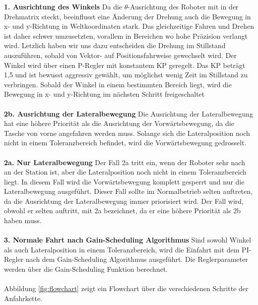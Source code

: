 \textbf{1. Ausrichtung des Winkels}
Da die $\theta$-Ausrichtung des Roboter mit in der Drehmatrix steckt, beeinflusst eine Änderung der Drehung auch die Bewegung in x- und y-Richtung in Weltkoordinaten stark. Das gleichzeitige Fahren und Drehen ist daher schwer umzusetzten, vorallem in Bereichen wo hohe Präzision verlangt wird. Letzlich haben wir uns dazu entscheiden die Drehung im Stillstand auszuführen, sobald von Vektor- auf Positionsfahrweise gewechselt wird. Der Winkel wird über einen P-Regler mit konstantem KP geregelt. Das KP beträgt 1,5 und ist bewusst aggressiv gewählt, um möglichst wenig Zeit im Stillstand zu verbringen. Sobald der Winkel in einem bestimmten Bereich liegt, wird die Bewegung in x- und y-Richtung im nächsten Schritt freigeschaltet\\
\\
\textbf{2b. Ausrichtung der Lateralbewegung}
Die Ausrichtung der Lateralbewegung hat eine höhere Priorität als die Ausrichtung der Vorwärtsbewegung, da die Tasche von vorne angefahren werden muss. Solange sich die Lateralposition noch nicht in einem Toleranzbereich befindet, wird die Vorwärtsbewegung gedrosselt. \\
\\
\textbf{2a. Nur Lateralbewegung}
Der Fall 2a tritt ein, wenn der Roboter sehr nach an der Station ist, aber die Lateralposition noch nicht in einem Toleranzbereich liegt. In diesem Fall wird die Vorwärtsbewegung komplett gesperrt und nur die Lateralbewegung ausgeführt. Dieser Fall sollte im Normalbetrieb selten auftreten, da die Ausrichtung der Lateralbewegung immer priorisiert wird. Der Fall wird, obwohl er selten auftritt, mit 2a bezeichnet, da er eine höhere Priorität als 2b haben muss.\\
\\
\textbf{3. Normale Fahrt nach Gain-Scheduling Algorithmus}
Sind sowohl Winkel als auch Lateralposition in einem Toleranzbereich, wird die Einfahrt mit dem PI-Regler nach dem Gain-Scheduling Algorithmus ausgeführt. Die Reglerparameter werden über die Gain-Scheduling Funktion berechnet. \\
\\
Abbildung \ref{fig:flowchart} zeigt ein Flowchart über die verschiedenen Schritte der Anfahrkette. \\

